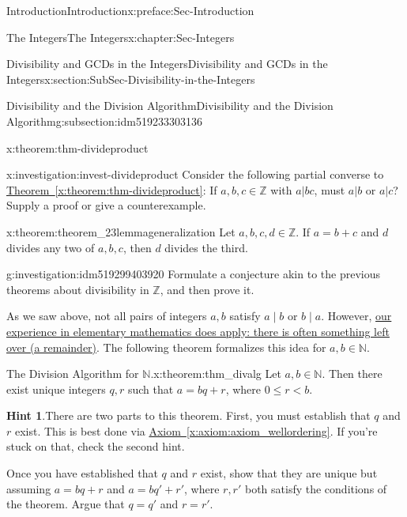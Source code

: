 \documentclass[oneside,10pt,]{book}
\newcommand{\blocktitlefont}{\relax}
\newcommand{\xreffont}{\relax}
\numberwithin{equation}{section}
\renewcommand{\le}{\leqslant}
\def\Z{{\mathbb Z}}
\def\N{{\mathbb N}}
\newcommand{\lt}{<}
\begin{document}
\begin{preface}{Introduction}{}{Introduction}{}{}{x:preface:Sec-Introduction}
\begin{chapterptx}{The Integers}{}{The Integers}{}{}{x:chapter:Sec-Integers}
\begin{sectionptx}{Divisibility and GCDs in the Integers}{}{Divisibility and GCDs in the Integers}{}{}{x:section:SubSec-Divisibility-in-the-Integers}
\begin{subsectionptx}{Divisibility and the Division Algorithm}{}{Divisibility and the Division Algorithm}{}{}{g:subsection:idm519233303136}
\begin{theorem}{}{}{x:theorem:thm-divideproduct}
\end{theorem}
\begin{investigation}{}{x:investigation:invest-divideproduct}%
Consider the following partial converse to \hyperref[x:theorem:thm-divideproduct]{Theorem~{\xreffont\ref{x:theorem:thm-divideproduct}}}: If \(a,b,c\in\Z\) with \(a|bc\), must \(a|b\) or \(a|c\)? Supply a proof or give a counterexample.%
\end{investigation}
\begin{theorem}{}{}{x:theorem:theorem_23lemmageneralization}%
Let \(a,b,c,d\in \Z\). If \(a = b+c\) and \(d\) divides any two of \(a,b,c\), then \(d\) divides the third.%
\end{theorem}
\begin{investigation}{}{g:investigation:idm519299403920}%
Formulate a conjecture akin to the previous theorems about divisibility in \(\Z\), and then prove it.%
\end{investigation}
As we saw above, not all pairs of integers \(a,b\) satisfy \(a\mid b\) or \(b\mid a\). However, \href{http://www.corestandards.org/Math/Content/4/NBT/B/6/}{our experience in elementary mathematics does apply: there is often something left over (a remainder)}. The following theorem formalizes this idea for \(a,b\in \N\).%
\begin{theorem}{The Division Algorithm for \(\N\).}{}{x:theorem:thm_divalg}%
\index{Division Algorithm (\(\N\))}%
Let \(a,b\in \N\). Then there exist unique integers \(q,r\) such that \(a = bq + r\), where \(0 \le r \lt b\).%



\textbf{\blocktitlefont Hint 1}.\quad{}There are two parts to this theorem. First, you must establish that \(q\) and \(r\) exist. This is best done via \hyperref[x:axiom:axiom_wellordering]{Axiom~{\xreffont\ref{x:axiom:axiom_wellordering}}}. If you're stuck on that, check the second hint.%
\par
Once you have established that \(q\) and \(r\) exist, show that they are unique but assuming \(a = bq+r\) and \(a = bq' + r'\), where \(r,r'\) both satisfy the conditions of the theorem. Argue that \(q = q'\) and \(r = r'\).%
\par\smallskip%


\end{theorem}
\end{subsectionptx}
\end{sectionptx}
\end{chapterptx}
\end{preface}
\end{document}
